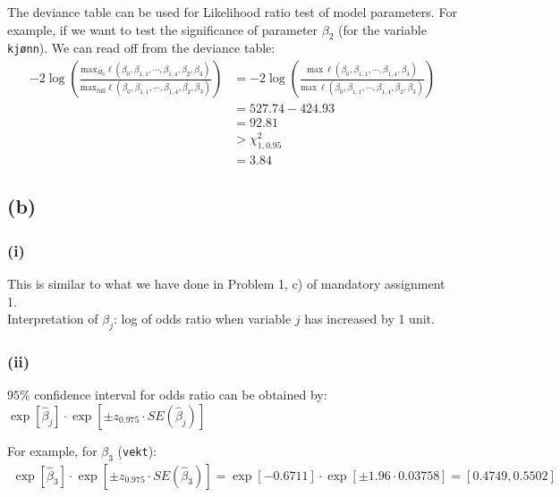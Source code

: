 The deviance table can be used for Likelihood ratio test of model parameters. For example, if we want to test the significance of parameter $\beta_{2}$ (for the variable \texttt{kj{\o}nn}). We can read off from the deviance table:
\begin{align*}
-2\log\left(\frac{\mathrm{max}_{H_{0}}\ell\left(\beta_{0}, \beta_{1,1}, \cdots, \beta_{1,4}, \beta_{2}, \beta_{3}\right)}{\mathrm{max}_{\mathrm{full}}\ell\left(\beta_{0}, \beta_{1,1}, \cdots, \beta_{1,4}, \beta_{2}, \beta_{3}\right)}\right)
&= -2\log\left(\frac{\mathrm{max~}\ell\left(\beta_{0}, \beta_{1,1}, \cdots, \beta_{1,4}, \beta_{3}\right)}{\mathrm{max~}\ell\left(\beta_{0}, \beta_{1,1}, \cdots, \beta_{1,4}, \beta_{2}, \beta_{3}\right)}\right)\\
&= 527.74 - 424.93\\
&= 92.81\\
&> \chi_{1,0.95}^{2}\\
&= 3.84
\end{align*}


\vspace{\baselineskip}
\subsection*{(b)}
\subsubsection*{(i)}
This is similar to what we have done in  Problem 1, c) of mandatory assignment 1.\\
Interpretation of $\beta_{j}$: log of odds ratio when variable $j$ has increased by 1 unit.

\subsubsection*{(ii)}
$95\%$ confidence interval for odds ratio can be obtained by:\\
$\exp\left[\widehat{\beta}_{j}\right] \cdot \exp\left[\pm z_{0.975}\cdot SE(\widehat{\beta}_{j})\right]$

For example, for $\beta_{3}$ (\texttt{vekt}):
\begin{align*}
\exp\left[\widehat{\beta}_{3}\right] \cdot \exp\left[\pm z_{0.975}\cdot SE(\widehat{\beta}_{3})\right] = \exp\left[-0.6711\right] \cdot \exp\left[\pm 1.96\cdot 0.03758\right] = [0.4749, 0.5502]
\end{align*}


\vspace{\baselineskip}
